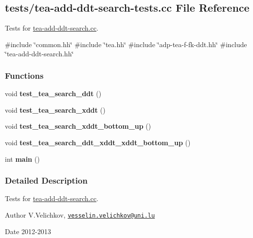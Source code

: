 \hypertarget{tea-add-ddt-search-tests_8cc}{\subsection{tests/tea-\/add-\/ddt-\/search-\/tests.cc \-File \-Reference}
\label{tea-add-ddt-search-tests_8cc}
}


\-Tests for \hyperlink{tea-add-ddt-search_8cc}{tea-\/add-\/ddt-\/search.\-cc}.  


{\ttfamily \#include \char`\"{}common.\-hh\char`\"{}}\*
{\ttfamily \#include \char`\"{}tea.\-hh\char`\"{}}\*
{\ttfamily \#include \char`\"{}adp-\/tea-\/f-\/fk-\/ddt.\-hh\char`\"{}}\*
{\ttfamily \#include \char`\"{}tea-\/add-\/ddt-\/search.\-hh\char`\"{}}\*
\subsubsection*{\-Functions}
\begin{DoxyCompactItemize}
\item 
\hypertarget{tea-add-ddt-search-tests_8cc_ab4db2aa3a7918fc2da1be7aac0d622e4}{void {\bfseries test\-\_\-tea\-\_\-search\-\_\-ddt} ()}\label{tea-add-ddt-search-tests_8cc_ab4db2aa3a7918fc2da1be7aac0d622e4}

\item 
\hypertarget{tea-add-ddt-search-tests_8cc_a418afa81bbea56e75e11bcc8df37265b}{void {\bfseries test\-\_\-tea\-\_\-search\-\_\-xddt} ()}\label{tea-add-ddt-search-tests_8cc_a418afa81bbea56e75e11bcc8df37265b}

\item 
\hypertarget{tea-add-ddt-search-tests_8cc_a7e4a199ba949c2127a693bbf12f18b3a}{void {\bfseries test\-\_\-tea\-\_\-search\-\_\-xddt\-\_\-bottom\-\_\-up} ()}\label{tea-add-ddt-search-tests_8cc_a7e4a199ba949c2127a693bbf12f18b3a}

\item 
\hypertarget{tea-add-ddt-search-tests_8cc_aa2b98729a6e2975165bd20275dcd5350}{void {\bfseries test\-\_\-tea\-\_\-search\-\_\-ddt\-\_\-xddt\-\_\-xddt\-\_\-bottom\-\_\-up} ()}\label{tea-add-ddt-search-tests_8cc_aa2b98729a6e2975165bd20275dcd5350}

\item 
\hypertarget{tea-add-ddt-search-tests_8cc_ae66f6b31b5ad750f1fe042a706a4e3d4}{int {\bfseries main} ()}\label{tea-add-ddt-search-tests_8cc_ae66f6b31b5ad750f1fe042a706a4e3d4}

\end{DoxyCompactItemize}


\subsubsection{\-Detailed \-Description}
\-Tests for \hyperlink{tea-add-ddt-search_8cc}{tea-\/add-\/ddt-\/search.\-cc}. \begin{DoxyAuthor}{\-Author}
\-V.\-Velichkov, \href{mailto:vesselin.velichkov@uni.lu}{\tt vesselin.\-velichkov@uni.\-lu} 
\end{DoxyAuthor}
\begin{DoxyDate}{\-Date}
2012-\/2013 
\end{DoxyDate}

